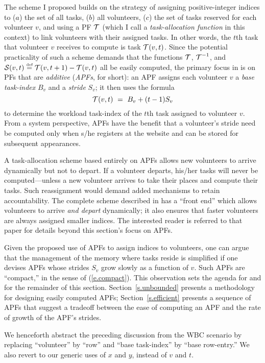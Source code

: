 The scheme I proposed builds on the strategy of assigning
positive-integer indices to ($a$) the set of all tasks, ($b$) all
volunteers, ($c$) the set of tasks reserved for each volunteer $v$,
and using a PF $\mbox{$\cal T$}$ (which I call a {\em task-allocation function} in
this context) to link volunteers with their assigned tasks.  In other
words, the $t$th task that volunteer $v$ receives to compute is task
$\mbox{$\cal T$}(v,t)$.  Since the potential practicality of such a scheme demands
that the functions $\mbox{$\cal T$}$, $\mbox{$\cal T$}^{-1}$, and $\mbox{$\cal S$}(v, t) \stackrel{\mbox{{\tiny def}}}{=} \mbox{$\cal T$}(v, t+1) -
\mbox{$\cal T$}(v, t)$ all be easily computed, the primary focus in
\cite{Rosenberg02} is on PFs that are {\it additive} ({\it APFs}, for
short): an APF assigns each volunteer $v$ a {\it base task-index}
$B_v$ and a {\it stride} $S_v$; it then uses the formula
\[ \mbox{$\cal T$}(v, t) \ = \ B_v + (t-1) S_v \]
to determine the workload task-index of the $t$th task assigned to
volunteer $v$.  From a system perspective, APFs have the benefit that
a volunteer's stride need be computed only when s/he registers at the
website and can be stored for subsequent appearances.

A task-allocation scheme based entirely on APFs allows new volunteers
to arrive dynamically but not to depart.  If a volunteer departs,
his/her tasks will never be computed---unless a new volunteer arrives
to take their places and compute their tasks.  Such reassignment would
demand added mechanisms to retain accountability.  The complete scheme
described in \cite{Rosenberg02} has a ``front end'' which allows
volunteers to arrive {\em and depart} dynamically; it also ensures
that faster volunteers are always assigned smaller indices.  The
interested reader is referred to that paper for details beyond this
section's focus on APFs.

Given the proposed use of APFs to assign indices to volunteers, one
can argue that the management of the memory where tasks reside is
simplified if one devises APFs whose strides $S_v$ grow slowly as a
function of $v$.  Such APFs are ``compact,'' in the sense of
(\ref{e.compact}).  This observation sets the agenda for
\cite{Rosenberg02} and for the remainder of this section.
Section~\ref{s.unbounded} presents a methodology for designing easily
computed APFs; Section~\ref{s.efficient} presents a sequence of APFs
that suggest a tradeoff between the ease of computing an APF and the
rate of growth of the APF's strides.

We henceforth abstract the preceding discussion from the WBC scenario
by replacing ``volunteer'' by ``row'' and ``base task-index'' by
``base row-entry.''  We also revert to our generic uses of $x$ and
$y$, instead of $v$ and $t$.

